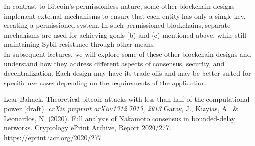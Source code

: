 \documentclass{report}
\begin{document}
In contrast to Bitcoin's permissionless nature, some other blockchain designs implement external mechanisms to ensure that each entity has only a single key, creating a permissioned system. In such permissioned blockchains, separate mechanisms are used for achieving goals (b) and (c) mentioned above, while still maintaining Sybil-resistance through other means.\\
In subsequent lectures, we will explore some of these other blockchain designs and understand how they address different aspects of consensus, security, and decentralization. Each design may have its trade-offs and may be better suited for specific use cases depending on the requirements of the application.

\renewcommand{\bibname}{References}
\begin{thebibliography}{9}
	 Lear Bahack. Theoretical bitcoin attacks with less than half of the computational power (draft). \textit{arXiv preprint arXiv:1312.7013, 2013}
	 Garay, J., Kiayias, A., \& Leonardos, N. (2020). Full analysis of Nakamoto consensus in bounded-delay networks. Cryptology ePrint Archive, Report 2020/277. \url{https://eprint.iacr.org/2020/277}
\end{thebibliography}
\end{document}
